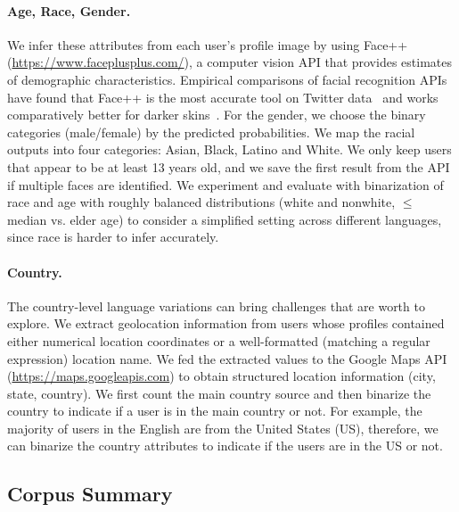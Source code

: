 \paragraph{Age, Race, Gender.}
We infer these attributes from each user's profile image by using Face++ (\url{https://www.faceplusplus.com/}),
a computer vision API that provides estimates of demographic characteristics.
Empirical comparisons of facial recognition APIs have found that Face++ is the most accurate tool on Twitter data~\cite{jung2018assessing} and works comparatively better for darker skins~\cite{buolamwini2018gender}.
For the gender, we choose the binary categories (male/female) by the predicted probabilities.
We map the racial outputs into four categories: Asian, Black, Latino and White.
We only keep users that appear to be at least 13 years old, and we save the first result from the API if multiple faces are identified.
We experiment and evaluate with binarization of race and age with roughly balanced distributions (white and nonwhite, $\leq$ median vs. elder age) to consider a simplified setting across different languages, since race is harder to infer accurately.

\paragraph{Country.}
The country-level language variations can bring challenges that are worth to explore.
We extract geolocation information from users whose profiles contained either numerical location coordinates or a well-formatted (matching a regular expression) location name. 
We fed the extracted values to the Google Maps API (\url{https://maps.googleapis.com}) to obtain structured location information (city, state, country).
We first count the main country source and then binarize the country to indicate if a user is in the main country or not. 
For example, the majority of users in the English are from the United States (US), therefore, we can binarize the country attributes to indicate if the users are in the US or not.

\subsection{Corpus Summary} 

